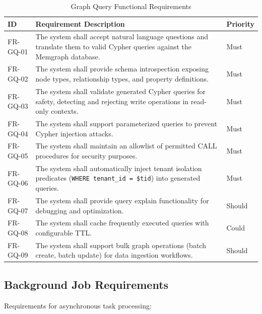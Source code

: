 \begin{table}[htbp]
\centering
\caption{Graph Query Functional Requirements}
\label{tab:fr-graph}
\small
\begin{tabularx}{\textwidth}{|l|X|l|}
\hline
\textbf{ID} & \textbf{Requirement Description} & \textbf{Priority} \\
\hline
FR-GQ-01 & The system shall accept natural language questions and translate them to valid Cypher queries against the Memgraph database. & Must \\
\hline
FR-GQ-02 & The system shall provide schema introspection exposing node types, relationship types, and property definitions. & Must \\
\hline
FR-GQ-03 & The system shall validate generated Cypher queries for safety, detecting and rejecting write operations in read-only contexts. & Must \\
\hline
FR-GQ-04 & The system shall support parameterized queries to prevent Cypher injection attacks. & Must \\
\hline
FR-GQ-05 & The system shall maintain an allowlist of permitted CALL procedures for security purposes. & Must \\
\hline
FR-GQ-06 & The system shall automatically inject tenant isolation predicates (\texttt{WHERE tenant\_id = \$tid}) into generated queries. & Must \\
\hline
FR-GQ-07 & The system shall provide query explain functionality for debugging and optimization. & Should \\
\hline
FR-GQ-08 & The system shall cache frequently executed queries with configurable TTL. & Could \\
\hline
FR-GQ-09 & The system shall support bulk graph operations (batch create, batch update) for data ingestion workflows. & Should \\
\hline
\end{tabularx}
\end{table}

\subsection{Background Job Requirements}
\label{subsec:fr-jobs}

Requirements for asynchronous task processing:

